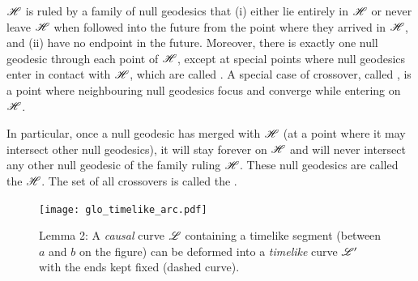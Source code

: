 \begin{prop}
\label{p:glo:prop3}
$\mathscr{H}$ is ruled by a family of null geodesics that (i) either lie entirely
in $\mathscr{H}$ or never leave $\mathscr{H}$ when followed into the future from the
point where they arrived in $\mathscr{H}$, and
(ii) have no endpoint in the future.
Moreover, there is exactly one null geodesic through each point of $\mathscr{H}$,
except at special points where null geodesics enter in contact with $\mathscr{H}$, which are
called . A special case
of crossover, called , is a point
where neighbouring null geodesics focus and converge while entering on $\mathscr{H}$.
\end{prop}
In particular, once a null geodesic has
merged with $\mathscr{H}$ (at a point where it may intersect other null geodesics),
it will stay forever on $\mathscr{H}$ and will never intersect any other null geodesic
of the family ruling $\mathscr{H}$. These null geodesics are called the
 $\mathscr{H}$.
The set of all crossovers is called the 
\cite{Siino98a,Siino98b,Brill14}.

\begin{figure}
\centerline{\texttt{[image: glo\_timelike\_arc.pdf]}}
\caption[]{\label{f:glo:timelike_arc} \footnotesize
Lemma 2: A \emph{causal} curve $\mathscr{L}$ containing a timelike segment (between
$a$ and $b$ on the figure) can be deformed into a \emph{timelike} curve $\mathscr{L}'$
with the ends kept fixed (dashed curve).}
\end{figure}


